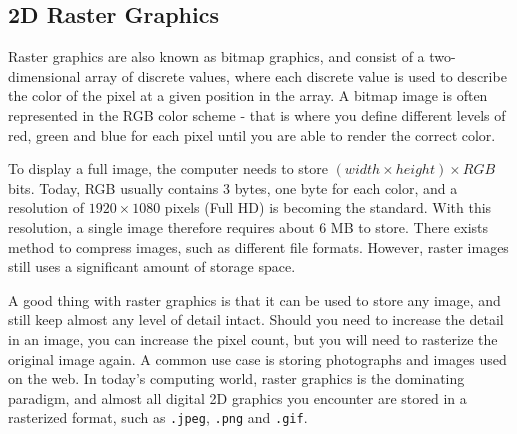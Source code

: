 \subsection{2D Raster Graphics}
Raster graphics are also known as bitmap graphics, and consist of a two-dimensional array of discrete values, where each discrete value is used to describe the color of the pixel at a given position in the array.
A bitmap image is often represented in the RGB color scheme - that is where you define different levels of red, green and blue for each pixel until you are able to render the correct color.

To display a full image, the computer needs to store \( (width \times height) \times RGB \) bits.
Today, RGB usually contains 3 bytes, one byte for each color, and a resolution of \(1920 \times 1080\) pixels (Full HD) is becoming the standard.
With this resolution, a single image therefore requires about 6 MB to store.
There exists method to compress images, such as different file formats. 
However, raster images still uses a significant amount of storage space.

A good thing with raster graphics is that it can be used to store any image, and still keep almost any level of detail intact. 
Should you need to increase the detail in an image, you can increase the pixel count, but you will need to rasterize the original image again.
A common use case is storing photographs and images used on the web. 
In today's computing world, raster graphics is the dominating paradigm, and almost all digital 2D graphics you encounter are stored in a rasterized format, such as \texttt{.jpeg}, \texttt{.png} and \texttt{.gif}.